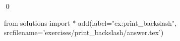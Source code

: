 
\begin{ex} 
  \label{ex:print_backslash}
  
  \qed
\end{ex} 
\begin{python0}
from solutions import *
add(label="ex:print_backslash",
    srcfilename='exercises/print_backslash/answer.tex') 
\end{python0}
